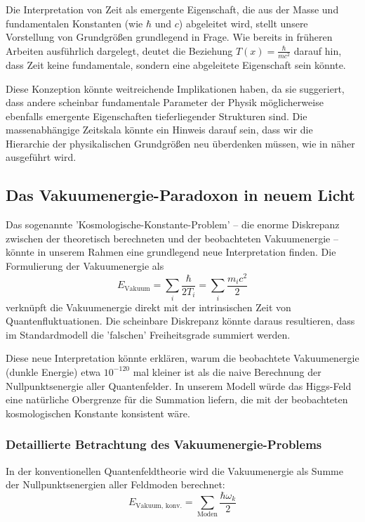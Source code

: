 \documentclass[a4paper,12pt]{article}
\newcommand{\Tfield}{T(x)} %
\begin{document}
	Die Interpretation von Zeit als emergente Eigenschaft, die aus der Masse und fundamentalen Konstanten (wie $\hbar$ und $c$) abgeleitet wird, stellt unsere Vorstellung von Grundgrößen grundlegend in Frage. Wie bereits in früheren Arbeiten \cite{pascher_zeit_2025, pascher_natur_2025} ausführlich dargelegt, deutet die Beziehung $\Tfield = \frac{\hbar}{mc^2}$ darauf hin, dass Zeit keine fundamentale, sondern eine abgeleitete Eigenschaft sein könnte. 
	
	Diese Konzeption könnte weitreichende Implikationen haben, da sie suggeriert, dass andere scheinbar fundamentale Parameter der Physik möglicherweise ebenfalls emergente Eigenschaften tieferliegender Strukturen sind. Die massenabhängige Zeitskala könnte ein Hinweis darauf sein, dass wir die Hierarchie der physikalischen Grundgrößen neu überdenken müssen, wie in \cite{pascher_kompl_2025} näher ausgeführt wird.
	
	\subsection{Das Vakuumenergie-Paradoxon in neuem Licht}
	
	Das sogenannte 'Kosmologische-Konstante-Problem' – die enorme Diskrepanz zwischen der theoretisch berechneten und der beobachteten Vakuumenergie – könnte in unserem Rahmen eine grundlegend neue Interpretation finden. Die Formulierung der Vakuumenergie als 
	\begin{equation}
		E_{\text{Vakuum}} = \sum_i \frac{\hbar}{2T_i} = \sum_i \frac{m_i c^2}{2}
	\end{equation}
	verknüpft die Vakuumenergie direkt mit der intrinsischen Zeit von Quantenfluktuationen. Die scheinbare Diskrepanz könnte daraus resultieren, dass im Standardmodell die 'falschen' Freiheitsgrade summiert werden.
	
	Diese neue Interpretation könnte erklären, warum die beobachtete Vakuumenergie (dunkle Energie) etwa $10^{-120}$ mal kleiner ist als die naive Berechnung der Nullpunktsenergie aller Quantenfelder. In unserem Modell würde das Higgs-Feld eine natürliche Obergrenze für die Summation liefern, die mit der beobachteten kosmologischen Konstante konsistent wäre.
	
	\subsubsection{Detaillierte Betrachtung des Vakuumenergie-Problems}
	
	In der konventionellen Quantenfeldtheorie wird die Vakuumenergie als Summe der Nullpunktsenergien aller Feldmoden berechnet:
	\begin{equation}
		E_{\text{Vakuum, konv.}} = \sum_{\text{Moden}} \frac{\hbar\omega_k}{2}
	\end{equation}
	
\end{document}
